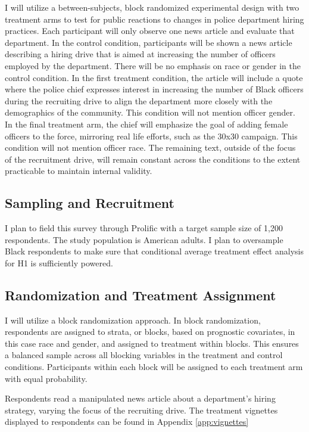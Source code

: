 \documentclass[12pt]{article}
\begin{document}
I will utilize a between-subjects, block randomized experimental design with two treatment arms to test for public reactions to changes in police department hiring practices. Each participant will only observe one news article and evaluate that department. In the control condition, participants will be shown a news article describing a hiring drive that is aimed at increasing the number of officers employed by the department. There will be no emphasis on race or gender in the control condition. In the first treatment condition, the article will include a quote where the police chief expresses interest in increasing the number of Black officers during the recruiting drive to align the department more closely with the demographics of the community. This condition will not mention officer gender. In the final treatment arm, the chief will emphasize the goal of adding female officers to the force, mirroring real life efforts, such as the 30x30 campaign. This condition will not mention officer race. The remaining text, outside of the focus of the recruitment drive, will remain constant across the conditions to the extent practicable to maintain internal validity.

\subsection{Sampling and Recruitment}

I plan to field this survey through Prolific with a target sample size of 1,200 respondents. The study population is American adults. I plan to oversample Black respondents to make sure that conditional average treatment effect analysis for H1 is sufficiently powered.

\subsection{Randomization and Treatment Assignment}

I will utilize a block randomization approach. In block randomization, respondents are assigned to strata, or blocks, based on prognostic covariates, in this case race and gender, and assigned to treatment within blocks. This ensures a balanced sample across all blocking variables in the treatment and control conditions. Participants within each block will be assigned to each treatment arm with equal probability.

Respondents read a manipulated news article about a department’s hiring strategy, varying the focus of the recruiting drive. The treatment vignettes displayed to respondents can be found in Appendix \ref{app:vignettes}
\end{document}
